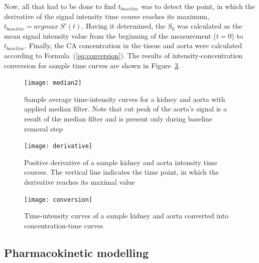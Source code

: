 Now, all that had to be done to find $t_{baseline}$ was to detect the point, in which the derivative of the signal intensity time course reaches its maximum, $t_{baseline}=argmax\;S'(t)$. Having it determined, the $S_0$ was calculated as the mean signal intensity value from the beginning of the measurement ($t=0$) to $t_{baseline}$. Finally, the CA concentration in the tissue and aorta were calculated according to Formula~(\ref{eq:conversion}). The results of intensity-concentration conversion for sample time curves are shown in Figure~\ref{fig:conversion}. 
\begin{figure}[H]
	\centering
	\texttt{[image: median2]}
\caption[Sample average time-intensity curves for a kidney and aorta with applied median filter]{Sample average time-intensity curves for a kidney and aorta with applied median filter. Note that cut peak of the aorta's signal is a result of the median filter and is present only during baseline removal step}
\label{fig:median}
\end{figure}

\begin{figure}[H]
	\centering
	\texttt{[image: derivative]}
\caption[Positive derivative of the sample kidney and aorta intensity time courses]{Positive derivative of a sample kidney and aorta intensity time courses. The vertical line indicates the time point, in which the derivative reaches its maximal value}
\label{fig:derivative}
\end{figure}

\begin{figure}[H]
	\centering
	\texttt{[image: conversion]}
\caption[Time courses of a sample kidney and aorta after intensity-concentration conversion]{Time-intensity curves of a sample kidney and aorta converted into concentration-time curves}
\label{fig:conversion}
\end{figure}


\subsection{Pharmacokinetic modelling}

